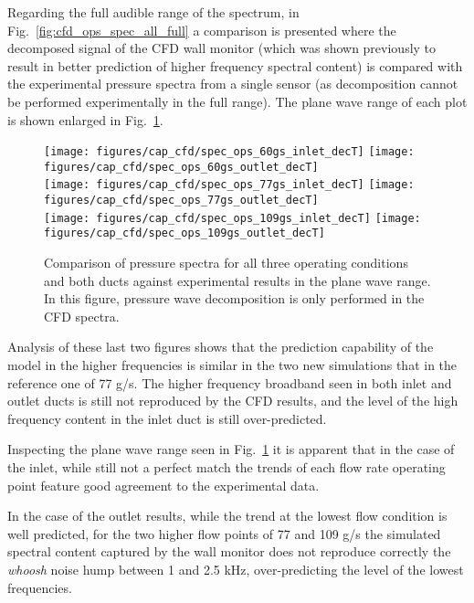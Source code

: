Regarding the full audible range of the spectrum, in Fig.~\ref{fig:cfd_ops_spec_all_full} a comparison is presented where the decomposed signal of the CFD wall monitor (which was shown previously to result in better prediction of higher frequency spectral content) is compared with the experimental pressure spectra from a single sensor (as decomposition cannot be performed experimentally in the full range). The plane wave range of each plot is shown enlarged in Fig.~\ref{fig:cfd_ops_spec_all_decT}.

\begin{figure}[htb!]
\centering
\texttt{[image: figures/cap\_cfd/spec\_ops\_60gs\_inlet\_decT]}
\texttt{[image: figures/cap\_cfd/spec\_ops\_60gs\_outlet\_decT]}\\[4mm]
\texttt{[image: figures/cap\_cfd/spec\_ops\_77gs\_inlet\_decT]}
\texttt{[image: figures/cap\_cfd/spec\_ops\_77gs\_outlet\_decT]}\\[4mm]
\texttt{[image: figures/cap\_cfd/spec\_ops\_109gs\_inlet\_decT]}
\texttt{[image: figures/cap\_cfd/spec\_ops\_109gs\_outlet\_decT]}
\caption{Comparison of pressure spectra for all three operating conditions and both ducts against experimental results in the plane wave range. In this figure, pressure wave
decomposition is only performed in the CFD spectra.}
\label{fig:cfd_ops_spec_all_decT}
\end{figure}

Analysis of these last two figures shows that the prediction capability of the model in the higher frequencies is similar in the two new simulations that in the reference one of 77 g/s. The higher frequency broadband seen in both inlet and outlet ducts is still not reproduced by the CFD results, and the level of the high frequency content in the inlet duct is still over-predicted.

Inspecting the plane wave range seen in Fig.~\ref{fig:cfd_ops_spec_all_decT} it is apparent that in the case of the inlet, while still not a perfect match the trends of each flow rate operating point feature good agreement to the experimental data. 

In the case of the outlet results, while the trend at the lowest flow condition is well predicted, for the two higher flow points of 77 and 109 g/s the simulated spectral content captured by the wall monitor does not reproduce correctly the \emph{whoosh} noise hump between 1 and 2.5 kHz, over-predicting the level of the lowest frequencies.

